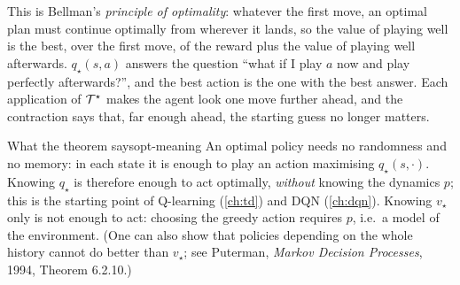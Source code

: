 \begin{intuition}
  This is Bellman's \emph{principle of optimality}: whatever the first
  move, an optimal plan must continue optimally from wherever it lands, so
  the value of playing well is the best, over the first move, of the reward
  plus the value of playing well afterwards. $q_\star(s, a)$ answers the
  question ``what if I play $a$ now and play perfectly afterwards?'', and
  the best action is the one with the best answer. Each application of
  $\mathcal{T}^\star$ makes the agent look one move further ahead, and the
  contraction says that, far enough ahead, the starting guess no longer
  matters.
\end{intuition}

\begin{remark}{What the theorem says}{opt-meaning}
  An optimal policy needs no randomness and no memory: in each state it is
  enough to play an action maximising $q_\star(s, \cdot)$. Knowing
  $q_\star$ is therefore enough to act optimally, \emph{without} knowing
  the dynamics $p$; this is the starting point of Q-learning
  (\cref{ch:td}) and DQN (\cref{ch:dqn}). Knowing $v_\star$ only is not enough
  to act: choosing the greedy action requires $p$, i.e.\ a model of the
  environment. (One
  can also show that policies depending on the whole history cannot do
  better than $v_\star$; see Puterman, \emph{Markov Decision Processes},
  1994, Theorem 6.2.10.)
\end{remark}

